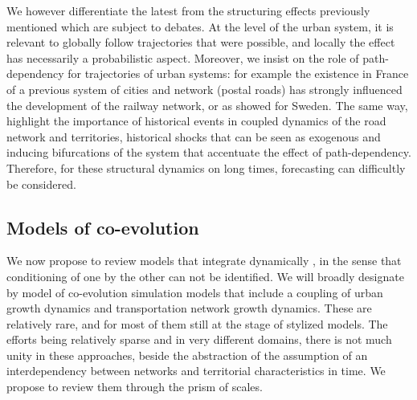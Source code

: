 We however differentiate the latest from the structuring effects previously mentioned which are subject to debates. At the level of the urban system, it is relevant to globally follow trajectories that were possible, and locally the effect has necessarily a probabilistic aspect. Moreover, we insist on the role of path-dependency for trajectories of urban systems: for example the existence in France of a previous system of cities and network (postal roads) has strongly influenced the development of the railway network, or as \cite{berger2017locomotives} showed for Sweden. The same way, \cite{doi:10.1068/b39089} highlight the importance of historical events in coupled dynamics of the road network and territories, historical shocks that can be seen as exogenous and inducing bifurcations of the system that accentuate the effect of path-dependency. Therefore, for these structural dynamics on long times, forecasting can difficultly be considered.


\subsection{Models of co-evolution}

 We now propose to review models that integrate dynamically , in the sense that  conditioning of one by the other can not be identified. We will broadly designate by model of co-evolution simulation models that include a coupling of urban growth dynamics and transportation network growth dynamics. These are relatively rare, and for most of them still at the stage of stylized models. The efforts being relatively sparse and in very different domains, there is not much unity in these approaches, beside the abstraction of the assumption of an interdependency between networks and territorial characteristics in time.  We propose  to review them through the prism of scales.



